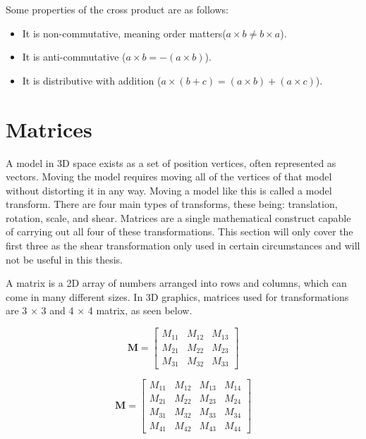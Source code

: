 \noindent
Some properties of the cross product are as follows:

\begin{itemize}
	\item It is non-commutative, meaning order matters($a \times b \not= b \times a$).
	\item It is anti-commutative ($a \times b = -(a \times b)$).
	\item It is distributive with addition ($a \times (b + c) = (a \times b) + (a \times c)$).
\end{itemize}

\section{Matrices}

A model in 3D space exists as a set of position vertices, often represented as vectors. Moving the model requires moving all of the vertices of that model without distorting it in any way. Moving a model like this is called a model transform. There are four main types of transforms, these being: translation, rotation, scale, and shear. Matrices are a single mathematical construct capable of carrying out all four of these transformations. This section will only cover the first three as the shear transformation only used in certain circumstances and will not be useful in this thesis.    

A matrix is a 2D array of numbers arranged into rows and columns, which can come in many different sizes. In 3D graphics, matrices used for transformations are 3 $\times$ 3 and 4 $\times$ 4 matrix, as seen below. 

\begin{equation}
\textbf{M} = \begin{bmatrix}
M_{11} & M_{12} & M_{13} \\
M_{21} & M_{22} & M_{23} \\
M_{31} & M_{32} & M_{33}
\end{bmatrix}
\end{equation}

\begin{equation}
\textbf{M} = \begin{bmatrix}
M_{11} & M_{12} & M_{13} & M_{14}\\
M_{21} & M_{22} & M_{23} & M_{24}\\
M_{31} & M_{32} & M_{33} & M_{34}\\
M_{41} & M_{42} & M_{43} & M_{44}
\end{bmatrix}
\end{equation}

